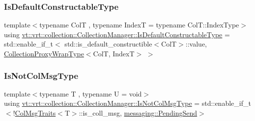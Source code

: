 \subsubsection{\texorpdfstring{Is\+Default\+Constructable\+Type}{IsDefaultConstructableType}}
{\footnotesize\ttfamily template$<$typename ColT , typename IndexT  = typename Col\+T\+::\+Index\+Type$>$ \\
using \hyperlink{structvt_1_1vrt_1_1collection_1_1_collection_manager_af8091fcb8218dad155ea028c9b5d283f}{vt\+::vrt\+::collection\+::\+Collection\+Manager\+::\+Is\+Default\+Constructable\+Type} =  std\+::enable\+\_\+if\+\_\+t$<$ std\+::is\+\_\+default\+\_\+constructible$<$ColT$>$\+::value, \hyperlink{structvt_1_1vrt_1_1collection_1_1_collection_manager_a56458ed7f9bb22b631b9b3a745f42f94}{Collection\+Proxy\+Wrap\+Type}$<$ColT, IndexT$>$ $>$}

\mbox{\label{structvt_1_1vrt_1_1collection_1_1_collection_manager_ae376deeefd4f89a0b1c93849977715d9}} 
\subsubsection{\texorpdfstring{Is\+Not\+Col\+Msg\+Type}{IsNotColMsgType}}
{\footnotesize\ttfamily template$<$typename T , typename U  = void$>$ \\
using \hyperlink{structvt_1_1vrt_1_1collection_1_1_collection_manager_ae376deeefd4f89a0b1c93849977715d9}{vt\+::vrt\+::collection\+::\+Collection\+Manager\+::\+Is\+Not\+Col\+Msg\+Type} =  std\+::enable\+\_\+if\+\_\+t$<$!\hyperlink{structvt_1_1vrt_1_1collection_1_1_col_msg_traits}{Col\+Msg\+Traits}$<$T$>$\+::is\+\_\+coll\+\_\+msg, \hyperlink{structvt_1_1messaging_1_1_pending_send}{messaging\+::\+Pending\+Send}$>$}

\mbox{\label{structvt_1_1vrt_1_1collection_1_1_collection_manager_a18e3a17d9eb086c6c2f499242b7faa1e}} 
